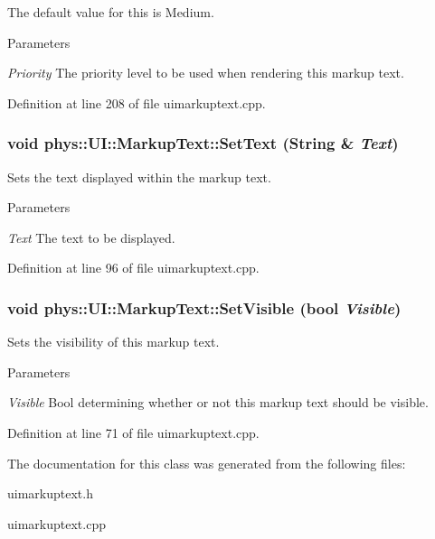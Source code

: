 The default value for this is Medium. 
\begin{DoxyParams}{Parameters}
\item[{\em Priority}]The priority level to be used when rendering this markup text. \end{DoxyParams}


Definition at line 208 of file uimarkuptext.cpp.

\hypertarget{classphys_1_1UI_1_1MarkupText_af5d9184959b56996e9727e2d7ccf8f22}{
\subsubsection[{SetText}]{\setlength{\rightskip}{0pt plus 5cm}void phys::UI::MarkupText::SetText ({\bf String} \& {\em Text})}}
\label{d7/d23/classphys_1_1UI_1_1MarkupText_af5d9184959b56996e9727e2d7ccf8f22}


Sets the text displayed within the markup text. 


\begin{DoxyParams}{Parameters}
\item[{\em Text}]The text to be displayed. \end{DoxyParams}


Definition at line 96 of file uimarkuptext.cpp.

\hypertarget{classphys_1_1UI_1_1MarkupText_ac5c38c21af2fbc3533697cacfec8fdc3}{
\subsubsection[{SetVisible}]{\setlength{\rightskip}{0pt plus 5cm}void phys::UI::MarkupText::SetVisible (bool {\em Visible})}}
\label{d7/d23/classphys_1_1UI_1_1MarkupText_ac5c38c21af2fbc3533697cacfec8fdc3}


Sets the visibility of this markup text. 


\begin{DoxyParams}{Parameters}
\item[{\em Visible}]Bool determining whether or not this markup text should be visible. \end{DoxyParams}


Definition at line 71 of file uimarkuptext.cpp.



The documentation for this class was generated from the following files:\begin{DoxyCompactItemize}
\item 
uimarkuptext.h\item 
uimarkuptext.cpp\end{DoxyCompactItemize}
